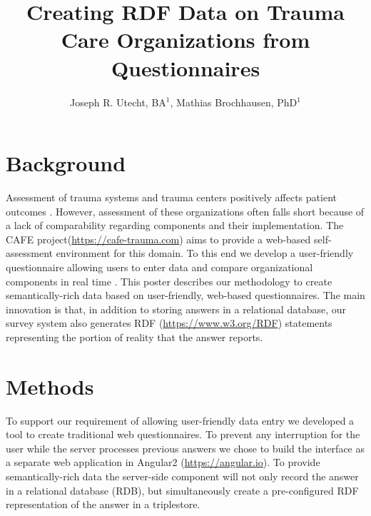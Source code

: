 \documentclass{amia}
\begin{document}
\title{Creating RDF Data on Trauma Care Organizations from Questionnaires}

\author{Joseph R. Utecht, BA$^{1}$, Mathias Brochhausen, PhD$^{1}$}


\maketitle

\section*{Background}

Assessment of trauma systems and trauma centers positively affects patient outcomes \cite{ref1, ref2}.
However, assessment of these organizations often falls short because of a lack of comparability regarding components and their implementation.
The CAFE project(\href{https://cafe-trauma.com}{https://cafe-trauma.com}) aims to provide a web-based self-assessment environment for this domain. 
To this end we develop a user-friendly questionnaire allowing users to enter data and compare organizational components in real time .
This poster describes our methodology to create semantically-rich data based on user-friendly, web-based questionnaires.
The main innovation is that, in addition to storing answers in a relational database, our survey system also generates RDF (\href{https://www.w3.org/RDF}{https://www.w3.org/RDF}) statements representing the portion of reality that the answer reports.

\section*{Methods}
To support our requirement of allowing user-friendly data entry we developed a tool to create traditional web questionnaires.
To prevent any interruption for the user while the server processes previous answers we chose to build the interface as a separate web application in Angular2 (\href{https://angular.io}{https://angular.io}).
To provide semantically-rich data the server-side component will not only record the answer in a relational database (RDB), but simultaneously create a pre-configured RDF representation of the answer in a triplestore.
\end{document}
